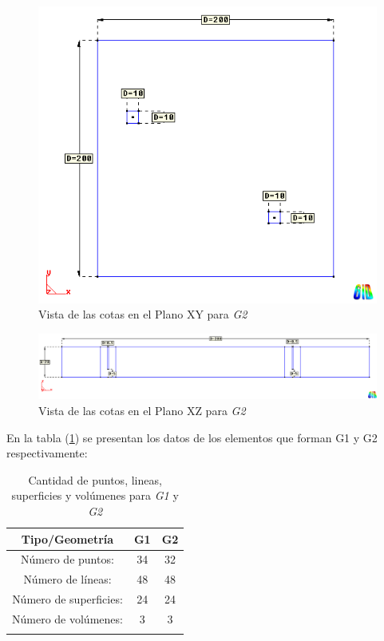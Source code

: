 \documentclass[10pt,a4paper,final]{article}
\begin{document}
%
%
\begin{figure}[tbhp]
\centerline{\includegraphics[scale=0.5]{img/200m/200_xy_cotas}}
\caption{Vista de las cotas en el Plano XY para \emph{G2}}
\label{200_xy_cotas}
\end{figure}
%
\begin{figure}[tbhp]
\centerline{\includegraphics[scale=0.4]{img/200m/200_xz_cotas}}
\caption{Vista de las cotas en el Plano XZ para \emph{G2}}
\label{200_xz_cotas}
\end{figure}
%
En la tabla (\ref{tabla_lista_entidades}) se presentan los datos de los elementos que forman G1 y G2 respectivamente:
%
\begin{table}[tbhp]
\begin{center}\begin{tabular}{ccc}
\hline \textbf{Tipo/Geometría} & \textbf{G1} & \textbf{G2} \\ 
\hline Número de puntos: & 34 & 32 \\ 
\hline Número de líneas: & 48 & 48 \\ 
\hline Número de superficies: & 24 & 24 \\ 
\hline Número de volúmenes: & 3 & 3 \\ 
\hline 
\label{tabla_lista_entidades}
\end{tabular}\end{center}
\caption{Cantidad de puntos, lineas, superficies y volúmenes para \emph{G1} y \emph{G2}}
\end{table}
%
%
\end{document}
